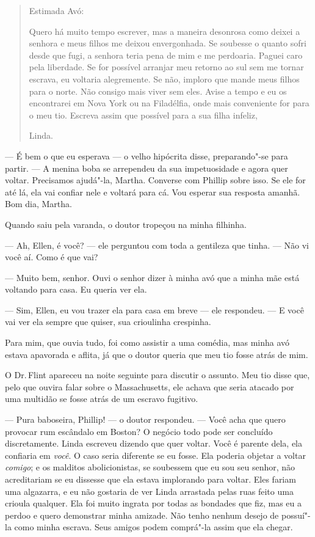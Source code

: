 \begin{quote}
Estimada Avó:

Quero há muito tempo escrever, mas a maneira desonrosa como deixei
a senhora e meus filhos me deixou envergonhada. Se soubesse o quanto
sofri desde que fugi, a senhora teria pena de mim e me perdoaria. Paguei
caro pela liberdade. Se for possível arranjar meu retorno ao sul sem me
tornar escrava, eu voltaria alegremente. Se não, imploro que mande meus
filhos para o norte. Não consigo mais viver sem eles. Avise a tempo e eu
os encontrarei em Nova York ou na Filadélfia, onde mais conveniente for
para o meu tio. Escreva assim que possível para a sua filha infeliz,

\hfill{}Linda. \enlargethispage{\baselineskip} 
\end{quote}

--- É bem o que eu esperava --- o velho
hipócrita disse, preparando"-se para partir. --- A menina boba se
arrependeu da sua impetuosidade e agora quer voltar. Precisamos
ajudá"-la, Martha. Converse com Phillip sobre isso. Se ele for até lá,
ela vai confiar nele e voltará para cá. Vou esperar sua resposta amanhã.
Bom dia, Martha.

Quando saiu pela varanda, o doutor
tropeçou na minha filhinha.

--- Ah, Ellen, é você? --- ele perguntou com toda a gentileza que tinha.
--- Não vi você aí. Como é que vai?

--- Muito bem, senhor. Ouvi o senhor
dizer à minha avó que a minha mãe está voltando para casa. Eu queria ver
ela.

--- Sim, Ellen, eu vou trazer ela para
casa em breve --- ele respondeu. --- E você vai ver ela sempre que
quiser, sua crioulinha crespinha.

Para mim, que ouvia tudo, foi como
assistir a uma comédia, mas minha avó estava apavorada e aflita, já que
o doutor queria que meu tio fosse atrás de mim.

O Dr.\,Flint apareceu na noite seguinte
para discutir o assunto. Meu tio disse que, pelo que ouvira falar sobre
o Massachusetts, ele achava que seria atacado por uma multidão se fosse
atrás de um escravo fugitivo.

--- Pura baboseira, Phillip! --- o doutor respondeu. --- Você acha que
quero provocar rum escândalo em Boston? O negócio todo pode ser
concluído discretamente. Linda escreveu dizendo que quer voltar. Você é
parente dela, ela confiaria em \emph{você}. O caso seria diferente se eu
fosse. Ela poderia objetar a voltar \emph{comigo}; e os malditos
abolicionistas, se soubessem que eu sou seu senhor, não acreditariam se
eu dissesse que ela estava implorando para voltar. Eles fariam uma
algazarra, e eu não gostaria de ver Linda arrastada pelas ruas feito uma
crioula qualquer. Ela foi muito ingrata por todas as bondades que fiz,
mas eu a perdoo e quero demonstrar minha amizade. Não tenho nenhum
desejo de possuí"-la como minha escrava. Seus amigos podem comprá"-la
assim que ela chegar.

